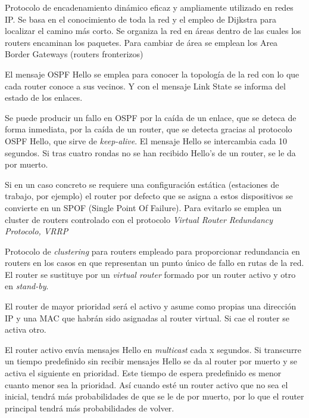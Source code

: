 \begin{defn}[OSPF]
Protocolo de encadenamiento dinámico eficaz y ampliamente utilizado en redes IP. Se basa en el conocimiento de toda la red y el empleo de Dijkstra para localizar el camino más corto. Se organiza la red en áreas dentro de las cuales los routers encaminan los paquetes. Para cambiar de área se emplean los Area Border Gateways (routers fronterizos)

El mensaje OSPF Hello se emplea para conocer la topología de la red con lo que cada router conoce a sus vecinos. Y con el mensaje Link State se informa del estado de los enlaces.
\end{defn}

Se puede producir un fallo en OSPF por la caída de un enlace, que se deteca de forma inmediata, por la caída de un router, que se detecta gracias al protocolo OSPF Hello, que sirve de \textit{keep-alive}. El mensaje Hello se intercambia cada 10 segundos. Si tras cuatro rondas no se han recibido Hello's de un router, se le da por muerto.

Si en un caso concreto se requiere una configuración estática (estaciones de trabajo, por ejemplo) el router por defecto que se asigna a estos dispositivos se convierte en un SPOF (Single Point Of Failure). Para evitarlo se emplea un cluster de routers controlado con el protocolo \textit{Virtual Router Redundancy Protocolo, VRRP}

\begin{defn}[VRRP]
Protocolo de \textit{clustering} para routers empleado para proporcionar redundancia en routers en los casos en que representan un punto único de fallo en rutas de la red. El router se sustituye por un \textit{virtual router} formado por un router activo y otro en \textit{stand-by}.

El router de mayor prioridad será el activo y asume como propias una dirección IP y una MAC que habrán sido asignadas al router virtual. Si cae el router se activa otro.
\end{defn}

El router activo envía mensajes Hello en \textit{multicast} cada x segundos. Si transcurre un tiempo predefinido sin recibir mensajes Hello se da al router por muerto y se activa el siguiente en prioridad. Este tiempo de espera predefinido es menor cuanto menor sea la prioridad. Así cuando esté un router activo que no sea el inicial, tendrá más probabilidades de que se le de por muerto, por lo que el router principal tendrá más probabilidades de volver.

